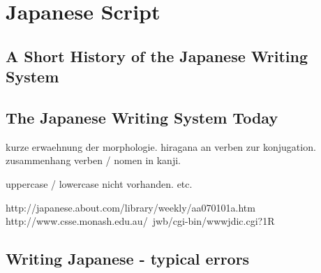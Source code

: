 
\chapter{Japanese Script}

\section{A Short History of the Japanese Writing System}
\label{sec:ahorthistoryofjapanesewritingsystem}

\section{The Japanese Writing System Today}
\label{sec:japanesewritingsystemtoday}

kurze erwaehnung der morphologie. hiragana an verben zur konjugation.
zusammenhang verben / nomen in kanji.

uppercase / lowercase nicht vorhanden. etc.

http://japanese.about.com/library/weekly/aa070101a.htm
http://www.csse.monash.edu.au/~jwb/cgi-bin/wwwjdic.cgi?1R


\section{Writing Japanese - typical errors}

